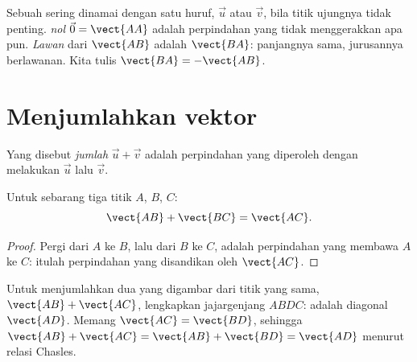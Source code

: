 \begin{notation}
Sebuah  sering dinamai dengan satu huruf, $\vec u$ atau $\vec v$, bila
titik ujungnya tidak penting. \emph{ nol} $\vec 0 = \vect{AA}$ adalah
perpindahan yang tidak menggerakkan apa pun. \emph{Lawan} dari
$\vect{AB}$ adalah $\vect{BA}$: panjangnya sama, jurusannya berlawanan. Kita tulis
$\vect{BA} = -\vect{AB}$.
\end{notation}

\section{Menjumlahkan vektor}

\begin{definition}\label{def:g10:vectors:sum}
Yang disebut \emph{jumlah} $\vec u + \vec v$ adalah perpindahan
yang diperoleh dengan melakukan $\vec u$ lalu $\vec v$.
\end{definition}

\begin{theorem}\label{thm:g10:vectors:chasles}
Untuk sebarang tiga titik $A$, $B$, $C$:
\[
\vect{AB} + \vect{BC} = \vect{AC}.
\]
\end{theorem}

\begin{proof}
Pergi dari $A$ ke $B$, lalu dari $B$ ke $C$, adalah perpindahan yang membawa
$A$ ke $C$: itulah perpindahan yang disandikan oleh $\vect{AC}$.
\end{proof}

\begin{remark}
Untuk menjumlahkan dua  yang digambar dari titik yang sama,
$\vect{AB} + \vect{AC}$, lengkapkan jajargenjang $ABDC$:  adalah
diagonal $\vect{AD}$. Memang $\vect{AC} = \vect{BD}$, sehingga
$\vect{AB} + \vect{AC} = \vect{AB} + \vect{BD} = \vect{AD}$ menurut relasi
Chasles.
\end{remark}

